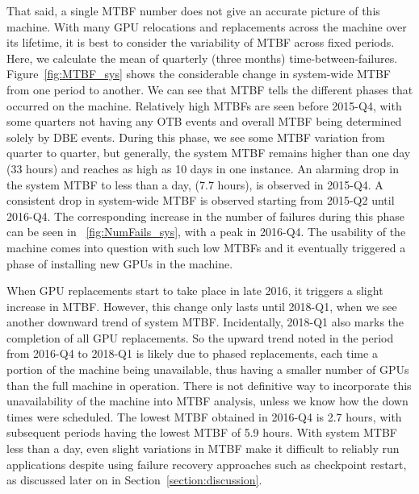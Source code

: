 That said, a single MTBF number does not give an accurate picture of this machine.
With many GPU relocations and replacements across the machine over its lifetime, it is 
best to consider the variability of MTBF across fixed periods. Here, we calculate 
the mean of quarterly (three months) time-between-failures. Figure~\ref{fig:MTBF_sys}
shows the considerable change in system-wide MTBF from one period to another. 
We can see that MTBF tells the different phases that occurred on the machine. 
Relatively high MTBFs are seen before 2015-Q4, with some quarters not having any OTB events 
and overall MTBF being determined solely by DBE events. During this
phase, we see some MTBF variation from quarter to quarter, but
generally, the system MTBF remains higher than one day (33 hours) and reaches as high
as 10 days in one instance. An alarming drop in the system MTBF to less than a day, (7.7 hours), is observed in 2015-Q4.
A consistent drop in system-wide MTBF is observed starting from 2015-Q2 until 2016-Q4. 
The corresponding increase in the number of failures during this phase can be seen in ~\ref{fig:NumFails_sys},
with a peak in 2016-Q4. The usability of the machine comes into
question with such low MTBFs and it eventually triggered 
a phase of installing new GPUs in the machine.

When GPU replacements start to take place in late 
2016, it triggers a slight increase in MTBF. However, this change only lasts until 2018-Q1, when we see another 
downward trend of system MTBF. Incidentally, 2018-Q1 also marks the completion of all GPU replacements. 
So the upward trend noted in the period from 2016-Q4 to 2018-Q1 is
likely due to phased replacements, each time a portion of the machine 
being unavailable, thus having a smaller number of GPUs than the full
machine in operation. 
There is not definitive way to incorporate this unavailability of the
machine into MTBF analysis, unless we know how the down times were scheduled.
The lowest MTBF obtained in 2016-Q4 is 2.7 hours, with subsequent periods having the 
lowest MTBF of 5.9 hours. With system MTBF less than a day, even slight variations in MTBF make it 
difficult to reliably run applications despite using failure recovery approaches such as checkpoint restart, 
as discussed later on in Section~\ref{section:discussion}. 

